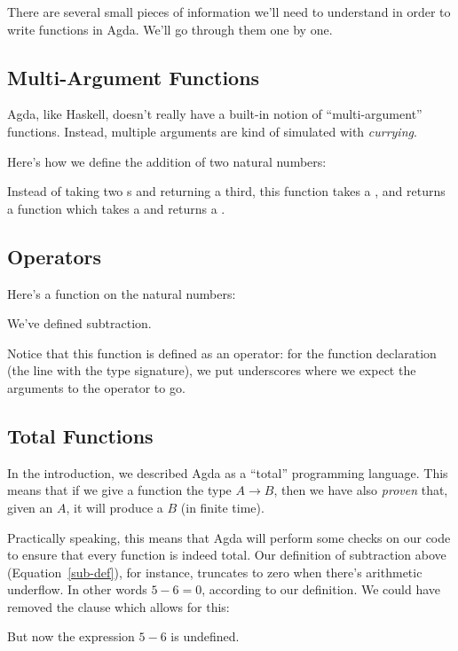 There are several small pieces of information we'll need to understand in order
to write functions in Agda.
We'll go through them one by one.
\subsection{Multi-Argument Functions}
Agda, like Haskell, doesn't really have a built-in notion of ``multi-argument''
functions.
Instead, multiple arguments are kind of simulated with \emph{currying}.

Here's how we define the addition of two natural numbers:
\begin{agdalisting*}
\end{agdalisting*}
Instead of taking two s and returning a third, this function takes a
, and returns a function which takes a  and returns a
.
\subsection{Operators}
Here's a function on the natural numbers:
\begin{agdalisting} \label{sub-def}
\end{agdalisting}
We've defined subtraction.

Notice that this function is defined as an operator: for the function
declaration (the line with the type signature), we put underscores where we
expect the arguments to the operator to go.

\subsection{Total Functions}
In the introduction, we described Agda as a ``total'' programming language.
This means that if we give a function the type \(A \rightarrow B\), then we have
also \emph{proven} that, given an \(A\), it will produce a \(B\) (in finite
time).

Practically speaking, this means that Agda will perform some checks on our
code to ensure that every function is indeed total.
Our definition of subtraction above (Equation~\ref{sub-def}), for instance,
truncates to zero when there's arithmetic underflow.
In other words \(5 - 6 = 0\), according to our definition.
We could have removed the clause which allows for this:
\begin{agdalisting*}
\end{agdalisting*}
But now the expression \(5 - 6\) is undefined.

